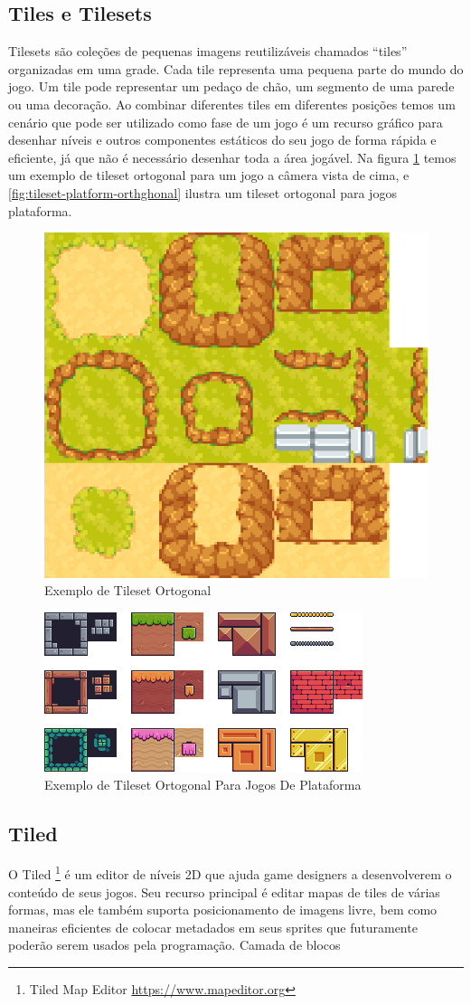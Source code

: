 \subsection{Tiles e Tilesets}
\label{sec:tiles-e-tilesets}
Tilesets são coleções de pequenas imagens reutilizáveis chamados “tiles” organizadas em uma grade. Cada tile representa uma pequena parte do mundo do jogo. Um tile pode representar um pedaço de chão, um segmento de uma parede ou uma decoração. Ao combinar diferentes tiles em diferentes posições temos um cenário que pode ser utilizado como fase de um jogo é um recurso gráfico para desenhar níveis e outros componentes estáticos do seu jogo de forma rápida e eficiente, já que não é necessário desenhar toda a área jogável.
Na figura \ref{fig:tileset-orthogonal} temos um exemplo de tileset ortogonal para um jogo a câmera vista de cima, e \ref{fig:tileset-platform-orthghonal} ilustra um tileset ortogonal para jogos plataforma.
\begin{figure}[h!]
    \centering
    \includegraphics[width=0.5\linewidth]{figuras/tileset.png}
    \caption{Exemplo de Tileset Ortogonal}
    \label{fig:tileset-orthogonal}
\end{figure}
\begin{figure}[h!]
    \centering
    \includegraphics[width=0.5\linewidth]{figuras/tileset-orthogonal-platform.png}
    \caption{Exemplo de Tileset Ortogonal Para Jogos De Plataforma}
    \label{fig:tileset-platform-orthogonal}
\end{figure}

\subsection{Tiled}
\label{sec:tiled}
O Tiled \footnote{Tiled Map Editor \url{https://www.mapeditor.org}} é um editor de níveis 2D que ajuda game designers a desenvolverem o conteúdo de seus jogos. Seu recurso principal é editar mapas de tiles de várias formas, mas ele também suporta posicionamento de imagens livre, bem como maneiras eficientes de colocar metadados em seus sprites que futuramente poderão serem usados pela programação.
Camada de blocos


